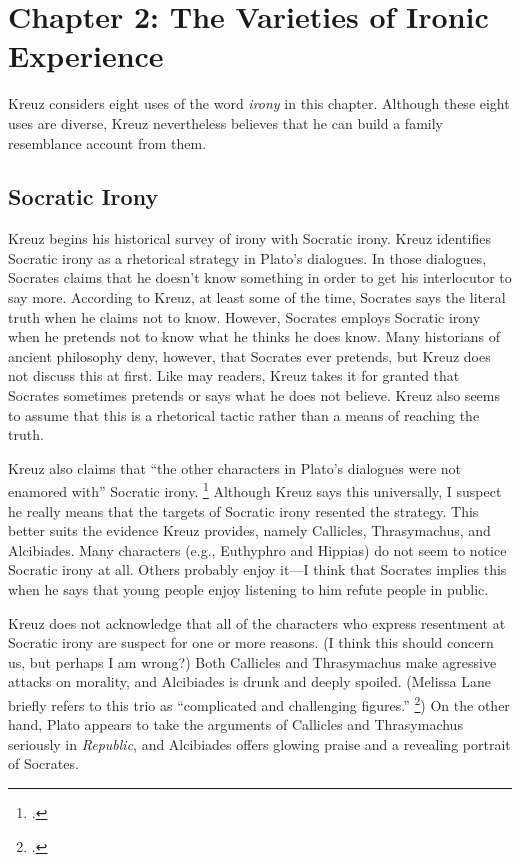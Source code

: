 \documentclass[12pt,letterpaper]{article}
\begin{document}

\section*{Chapter 2: The Varieties of Ironic Experience}

Kreuz considers eight uses of the word \textit{irony} in this chapter.
Although these eight uses are diverse, Kreuz nevertheless believes that he can build a family resemblance account from them.

\subsection*{Socratic Irony}

Kreuz begins his historical survey of irony with Socratic irony.
Kreuz identifies Socratic irony as a rhetorical strategy in Plato's dialogues.
In those dialogues, Socrates claims that he doesn't know something in order to get his interlocutor to say more.
According to Kreuz, at least some of the time, Socrates says the literal truth when he claims not to know.
However, Socrates employs Socratic irony when he pretends not to know what he thinks he does know.
Many historians of ancient philosophy deny, however, that Socrates ever pretends, but Kreuz does not discuss this at first.
Like may readers, Kreuz takes it for granted that Socrates sometimes pretends or says what he does not believe.
Kreuz also seems to assume that this is a rhetorical tactic rather than a means of reaching the truth.

Kreuz also claims that ``the other characters in Plato's dialogues were not enamored with'' Socratic irony.%
\footcite[][15]{kreuz-irony-and-sarcasm-2020}
Although Kreuz says this universally, I suspect he really means that the targets of Socratic irony resented the strategy.
This better suits the evidence Kreuz provides, namely Callicles, Thrasymachus, and Alcibiades.
Many characters (e.g., Euthyphro and Hippias) do not seem to notice Socratic irony at all.
Others probably enjoy it---I think that Socrates implies this when he says that young people enjoy listening to him refute people in public.

Kreuz does not acknowledge that all of the characters who express resentment at Socratic irony are suspect for one or more reasons.
(I think this should concern us, but perhaps I am wrong?)
Both Callicles and Thrasymachus make agressive attacks on morality, and Alcibiades is drunk and deeply spoiled.
(Melissa Lane briefly refers to this trio as ``complicated and challenging figures.''%
\footcite[][237]{lane-reconsidering-socratic-irony-2011})
On the other hand, Plato appears to take the arguments of Callicles and Thrasymachus seriously in \textit{Republic}, and Alcibiades offers glowing praise and a revealing portrait of Socrates.
\end{document}
